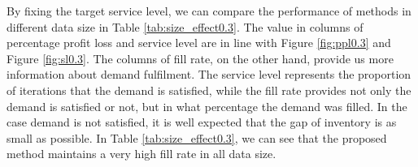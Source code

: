 \documentclass{article}
\begin{document}
By fixing the target service level, we can compare the performance of methods in different data size in Table \ref{tab:size_effect0.3}. The value in columns of percentage profit loss and service level are in line with Figure \ref{fig:ppl0.3} and Figure \ref{fig:sl0.3}. The columns of fill rate, on the other hand, provide us more information about demand fulfilment. The service level represents the proportion of iterations that the demand is satisfied, while the fill rate provides not only the demand is satisfied or not, but in what percentage the demand was filled. In the case demand is not satisfied, it is well expected that the gap of inventory is as small as possible. In Table \ref{tab:size_effect0.3}, we can see that the proposed method maintains a very high fill rate in all data size. 

\begin{table}[ht]
\caption{Size effect at 0.3 target service level}
\label{tab:size_effect0.3}
\centering {} 
\end{table}
\end{document}
